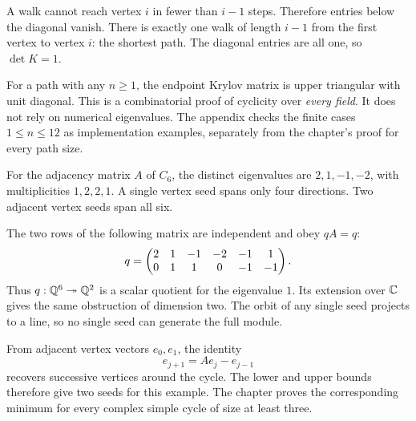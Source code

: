 A walk cannot reach vertex $i$ in fewer than $i-1$ steps. Therefore entries below the diagonal vanish. There is exactly one walk of length $i-1$ from the first vertex to vertex $i$: the shortest path. The diagonal entries are all one, so $\det K=1$.

For a path with any $n\ge1$, the endpoint Krylov matrix is upper triangular with unit diagonal. This is a combinatorial proof of cyclicity over \emph{every field}. It does not rely on numerical eigenvalues. The appendix checks the finite cases $1\le n\le12$ as implementation examples, separately from the chapter's proof for every path size.


For the adjacency matrix $A$ of $C_6$, the distinct eigenvalues are $2,1,-1,-2$, with multiplicities $1,2,2,1$. A single vertex seed spans only four directions. Two adjacent vertex seeds span all six.


The two rows of the following matrix are independent and obey $qA=q$:
\[
q=\begin{pmatrix}2&1&-1&-2&-1&1\\0&1&1&0&-1&-1\end{pmatrix}.
\]
Thus $q:\mathbb Q^6\twoheadrightarrow\mathbb Q^2$ is a scalar quotient for the eigenvalue $1$. Its extension over $\mathbb C$ gives the same obstruction of dimension two. The orbit of any single seed projects to a line, so no single seed can generate the full module.

From adjacent vertex vectors $e_0,e_1$, the identity
\[
e_{j+1}=Ae_j-e_{j-1}
\]
recovers successive vertices around the cycle. The lower and upper bounds therefore give two seeds for this example. The chapter proves the corresponding minimum for every complex simple cycle of size at least three.


